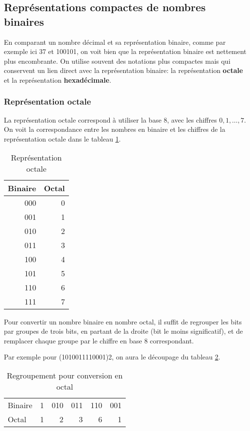 \documentclass[11pt]{article}
\begin{document}
\subsection{Représentations compactes de nombres binaires}
\label{sec:org137b55f}

En comparant un nombre décimal et sa représentation binaire, comme par
exemple ici 37 et 100101, on voit bien que la représentation binaire
est nettement plus encombrante. On utilise souvent des notations plus
compactes mais qui conservent un lien direct avec la représentation
binaire: la représentation \textbf{octale} et la représentation
\textbf{hexadécimale}.

\subsubsection{Représentation octale}
\label{sec:orgd67b192}

La représentation octale correspond à utiliser la base 8, avec les
chiffres \(0, 1, \ldots, 7\). On voit la correspondance entre les
nombres en binaire et les chiffres de la représentation octale dans le
tableau \ref{tab:org10abe05}.

\begin{table}[htbp]
\caption{\label{tab:org10abe05}Représentation octale}
\centering
\begin{tabular}{rr}
Binaire & Octal\\
\hline
000 & 0\\
001 & 1\\
010 & 2\\
011 & 3\\
100 & 4\\
101 & 5\\
110 & 6\\
111 & 7\\
\end{tabular}
\end{table}

Pour convertir un nombre binaire en nombre octal, il suffit de
regrouper les bits par groupes de trois bits, en partant de la droite
(bit le moins significatif), et de remplacer chaque groupe par le
chiffre en base 8 correspondant.

Par exemple pour (1010011110001)2, on aura le découpage du tableau
\ref{tab:org593650b}.

\begin{table}[htbp]
\caption{\label{tab:org593650b}Regroupement pour conversion en octal}
\centering
\begin{tabular}{lrrrrr}
 &  &  &  &  & \\
\hline
Binaire & 1 & 010 & 011 & 110 & 001\\
Octal & 1 & 2 & 3 & 6 & 1\\
\end{tabular}
\end{table}
\end{document}
